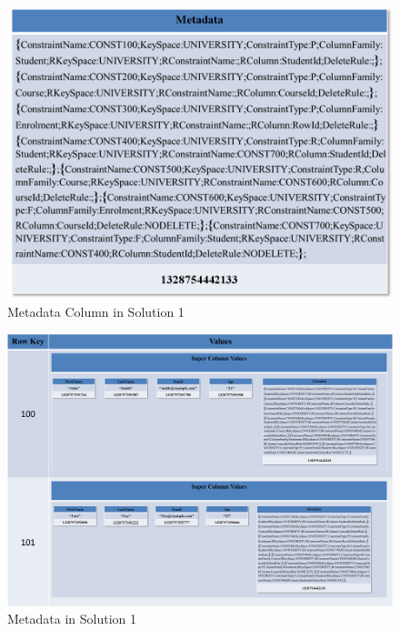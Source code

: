 
	\begin{figure}[h] 
			\centering
				\includegraphics[width=.8\textwidth]{./figure/Solutions/Sol1-MD-Col.png}
				\caption{Metadata Column in Solution 1}
				\label{fd:Metadata-Column}
	\end{figure}
	    
	\begin{figure}
		\begin{landscape}
			\centering
			\includegraphics[width=1\textwidth]{./figure/Solutions/Sol1-MD-ColumnFamily.png}
			
			\caption{Metadata in Solution 1}\label{fd:Metadata-Solution1}
			\end{landscape}
		\end{figure}
	
